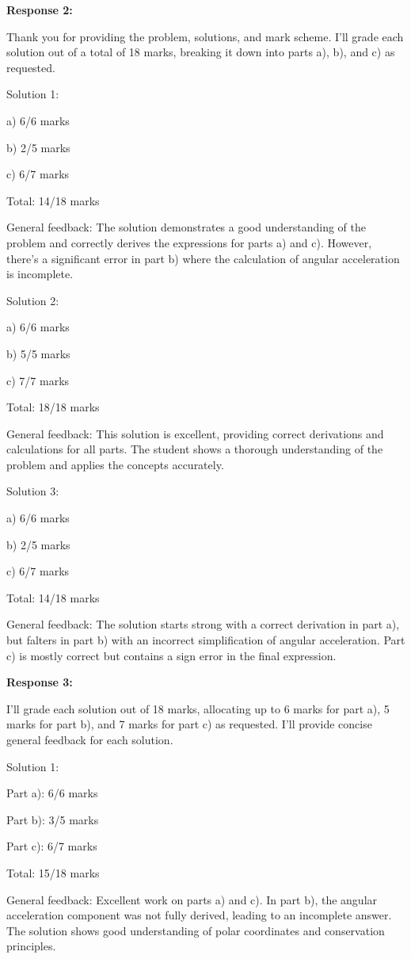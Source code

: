 \documentclass[a4paper,11pt]{article}
\begin{document}
\bigskip
\textbf{Response 2:}

Thank you for providing the problem, solutions, and mark scheme. I'll grade each solution out of a total of 18 marks, breaking it down into parts a), b), and c) as requested.

Solution 1:

a) 6/6 marks

b) 2/5 marks

c) 6/7 marks

Total: 14/18 marks

General feedback: The solution demonstrates a good understanding of the problem and correctly derives the expressions for parts a) and c). However, there's a significant error in part b) where the calculation of angular acceleration is incomplete.

Solution 2:

a) 6/6 marks

b) 5/5 marks

c) 7/7 marks

Total: 18/18 marks

General feedback: This solution is excellent, providing correct derivations and calculations for all parts. The student shows a thorough understanding of the problem and applies the concepts accurately.

Solution 3:

a) 6/6 marks

b) 2/5 marks

c) 6/7 marks

Total: 14/18 marks

General feedback: The solution starts strong with a correct derivation in part a), but falters in part b) with an incorrect simplification of angular acceleration. Part c) is mostly correct but contains a sign error in the final expression.

\bigskip
\textbf{Response 3:}

I'll grade each solution out of 18 marks, allocating up to 6 marks for part a), 5 marks for part b), and 7 marks for part c) as requested. I'll provide concise general feedback for each solution.

Solution 1:

Part a): 6/6 marks

Part b): 3/5 marks

Part c): 6/7 marks

Total: 15/18 marks

General feedback: Excellent work on parts a) and c). In part b), the angular acceleration component was not fully derived, leading to an incomplete answer. The solution shows good understanding of polar coordinates and conservation principles.
\end{document}
